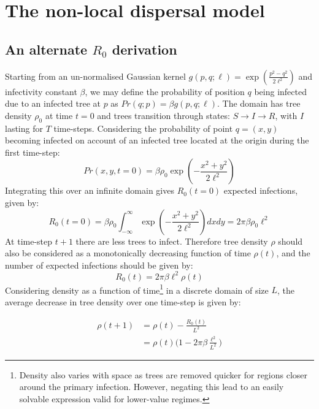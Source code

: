 \chapter{The non-local dispersal model}
\label{section:apendix_A}

\section{An alternate $R_0$ derivation}
\label{eq:alternate-R0}

Starting from an un-normalised Gaussian kernel $g(p, q; \ell) = \exp(\frac{p^2-q^2}{2\ell^2})$ and infectivity constant $\beta$, we may define the probability of position $q$ being infected due to an infected tree at $p$ as $Pr(q; p) = \beta g(p, q; \ell)$. The domain has tree density $\rho_0$ at time $t=0$ and trees transition through states: $S\rightarrow I\rightarrow R$, with $I$ lasting for $T$ time-steps. Considering the probability of point $q = (x, y)$ becoming infected on account of an infected tree located at the origin during the first time-step:
\begin{equation}
    Pr(x, y, t=0) = \beta \rho_0 \exp(-\frac{x^2+y^2}{2\ell^2})
\end{equation}{}
 Integrating this over an infinite domain gives $R_0(t=0)$ expected infections, given by:
\begin{equation}
    R_0(t = 0) = \beta \rho_0 \int^{\infty}_{-\infty} \exp(-\frac{x^2+y^2}{2\ell^2})dx dy= 2\pi\beta\rho_0\ell^2
\end{equation}{}
At time-step $t+1$ there are less trees to infect. Therefore tree density $\rho$ should also be considered as a monotonically decreasing function of time $\rho(t)$, and the number of expected infections should be given by:
\begin{equation}
    R_0(t) = 2\pi\beta\ell^2\rho(t)
    \label{eq:r0-A}
\end{equation}{}
 Considering density as a function of time\footnote{Density also varies with space as trees are removed quicker for regions closer around the primary infection. However, negating this lead to an easily solvable expression valid for lower-value regimes.} in a discrete domain of size $L$, the average decrease in tree density over one time-step is given by:

\begin{equation}
\label{eq:discrete-rho-t-A}
\begin{split}
\rho(t+1) & = \rho(t) - \frac{R_0(t)}{L^2} \\
 & = \rho(t)\Big(1 - 2\pi\beta\frac{\ell^2}{L^2} \Big)
\end{split}
\end{equation}


